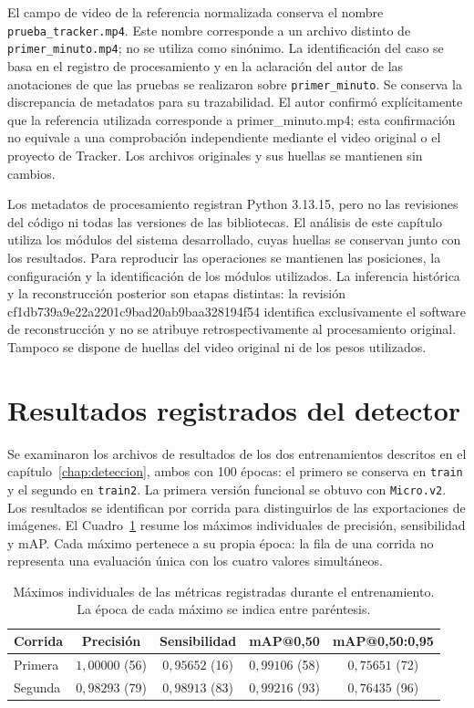 El campo de video de la referencia normalizada conserva el nombre \nolinkurl{prueba_tracker.mp4}. Este nombre corresponde a un archivo distinto de \texttt{primer\_minuto.mp4}; no se utiliza como sinónimo. La identificación del caso se basa en el registro de procesamiento y en la aclaración del autor de las anotaciones de que las pruebas se realizaron sobre \texttt{primer\_minuto}. Se conserva la discrepancia de metadatos para su trazabilidad. El autor confirmó explícitamente que la referencia utilizada corresponde a primer\_minuto.mp4; esta confirmación no equivale a una comprobación independiente mediante el video original o el proyecto de Tracker. Los archivos originales y sus huellas se mantienen sin cambios.

Los metadatos de procesamiento registran Python 3.13.15, pero no las revisiones del código ni todas las versiones de las bibliotecas. El análisis de este capítulo utiliza los módulos del sistema desarrollado, cuyas huellas se conservan junto con los resultados. Para reproducir las operaciones se mantienen las posiciones, la configuración y la identificación de los módulos utilizados. La inferencia histórica y la reconstrucción posterior son etapas distintas: la revisión cf1db739a9e22a2201c9bad20ab9baa328194f54 identifica exclusivamente el software de reconstrucción y no se atribuye retrospectivamente al procesamiento original. Tampoco se dispone de huellas del video original ni de los pesos utilizados.

\section{Resultados registrados del detector}

Se examinaron los archivos de resultados de los dos entrenamientos descritos en el capítulo~\ref{chap:deteccion}, ambos con 100 épocas: el primero se conserva en \texttt{train} y el segundo en \texttt{train2}. La primera versión funcional se obtuvo con \texttt{Micro.v2}. Los resultados se identifican por corrida para distinguirlos de las exportaciones de imágenes. El Cuadro~\ref{tab:maximos-detector} resume los máximos individuales de precisión, sensibilidad y mAP. Cada máximo pertenece a su propia época: la fila de una corrida no representa una evaluación única con los cuatro valores simultáneos.

\begin{table}[htbp]
 \centering
 \caption{Máximos individuales de las métricas registradas durante el entrenamiento. La época de cada máximo se indica entre paréntesis.}
 \label{tab:maximos-detector}
 \small
 \begin{tabular}{@{}lcccc@{}}
  \toprule
  Corrida & Precisión & Sensibilidad & mAP@0,50 & mAP@0,50:0,95 \\
  \midrule
  Primera & $1{,}00000$ (56) & $0{,}95652$ (16) & $0{,}99106$ (58) & $0{,}75651$ (72) \\
  Segunda & $0{,}98293$ (79) & $0{,}98913$ (83) & $0{,}99216$ (93) & $0{,}76435$ (96) \\
  \bottomrule
 \end{tabular}
\end{table}

